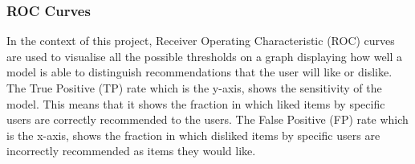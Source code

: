 


\subsubsection{ROC Curves}
In the context of this project, Receiver Operating Characteristic (ROC) curves  are used to visualise all the possible thresholds on a graph displaying how well a model is able to distinguish recommendations that the user will like or dislike. The True Positive (TP) rate which is the y-axis, shows the sensitivity of the model. This means that it shows the fraction in which liked items by specific users are correctly recommended to the users. The False Positive (FP) rate which is the x-axis, shows the fraction in which disliked items by specific users are incorrectly recommended as items they would like. 

